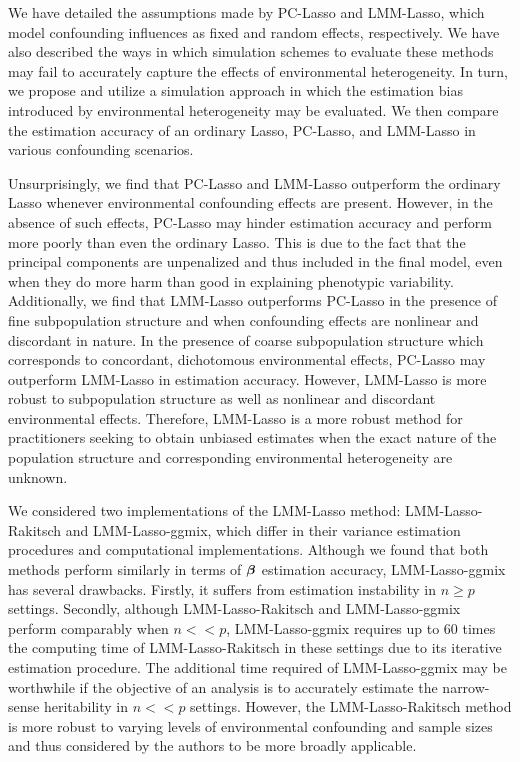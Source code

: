 We have detailed the assumptions made by PC-Lasso and LMM-Lasso, which model confounding influences as fixed and random effects, respectively. We have also described the ways in which simulation schemes to evaluate these methods may fail to accurately capture the effects of environmental heterogeneity. In turn, we propose and utilize a simulation approach in which the estimation bias introduced by environmental heterogeneity may be evaluated. We then compare the estimation accuracy of an ordinary Lasso, PC-Lasso, and LMM-Lasso in various confounding scenarios.

Unsurprisingly, we find that PC-Lasso and LMM-Lasso outperform the ordinary Lasso whenever environmental confounding effects are present. However, in the absence of such effects, PC-Lasso may hinder estimation accuracy and perform more poorly than even the ordinary Lasso. This is due to the fact that the principal components are unpenalized and thus included in the final model, even when they do more harm than good in explaining phenotypic variability. Additionally, we find that LMM-Lasso outperforms PC-Lasso in the presence of fine subpopulation structure and when confounding effects are nonlinear and discordant in nature. In the presence of coarse subpopulation structure which corresponds to concordant, dichotomous environmental effects, PC-Lasso may outperform LMM-Lasso in estimation accuracy. However, LMM-Lasso is more robust to subpopulation structure as well as nonlinear and discordant environmental effects. Therefore, LMM-Lasso is a more robust method for practitioners seeking to obtain unbiased estimates when the exact nature of the population structure and corresponding environmental heterogeneity are unknown.  

We considered two implementations of the LMM-Lasso method: LMM-Lasso-Rakitsch and LMM-Lasso-ggmix, which differ in their variance estimation procedures and computational implementations. Although we found that both methods perform similarly in terms of $\boldsymbol{\beta}{}$ estimation accuracy, LMM-Lasso-ggmix has several drawbacks. Firstly, it suffers from estimation instability in $n \ge p$ settings. Secondly, although LMM-Lasso-Rakitsch and LMM-Lasso-ggmix perform comparably when $n << p$, LMM-Lasso-ggmix requires up to 60 times the computing time of LMM-Lasso-Rakitsch in these settings due to its iterative estimation procedure. The additional time required of LMM-Lasso-ggmix may be worthwhile if the objective of an analysis is to accurately estimate the narrow-sense heritability in $n << p$ settings. However, the LMM-Lasso-Rakitsch method is more robust to varying levels of environmental confounding and sample sizes and thus considered by the authors to be more broadly applicable. 

